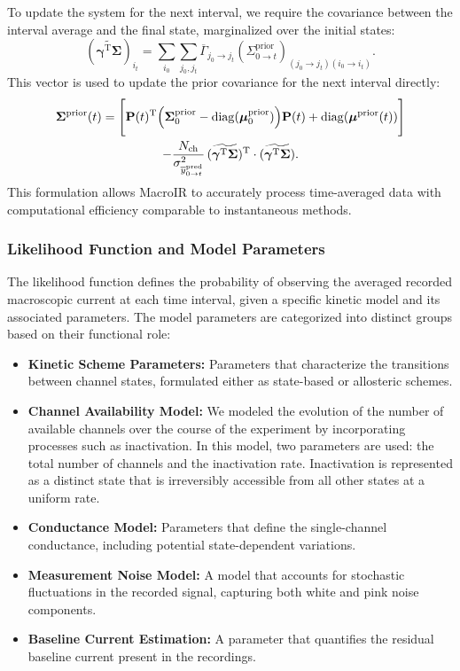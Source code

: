 \documentclass[9pt]{elife}
\begin{document}
To update the system for the next interval, we require the covariance between the interval average and the final state, marginalized over the initial states:
\begin{equation}
	(\widetilde{\boldsymbol{\gamma}^{\mathrm{T}} \boldsymbol{\Sigma}})_{i_t} = \sum_{i_0} \sum_{j_0, j_t} \overline{\Gamma}_{j_0 \rightarrow j_t} (\Sigma^{\text{prior}}_{0 \rightarrow t})_{(j_0 \rightarrow j_t)(i_0 \rightarrow i_t)}.
\end{equation}
This vector is used to update the prior covariance for the next interval directly:
\begin{multline}
	\boldsymbol{\Sigma}^{\text{prior}}(t) = \Biggl[ \mathbf{P}(t)^{\mathrm{T}} \Bigl( \boldsymbol{\Sigma}^{\text{prior}}_{0} - \mathrm{diag}(\boldsymbol{\mu}^{\text{prior}}_{0}) \Bigr) \mathbf{P}(t) + \mathrm{diag}(\boldsymbol{\mu}^{\text{prior}}(t)) \Biggr] \\ 
	- \frac{N_{\text{ch}}}{\sigma^2_{\overline{y}^{\text{pred}}_{0 \rightarrow t}}} \, (\widetilde{\boldsymbol{\gamma}^{\mathrm{T}} \boldsymbol{\Sigma}})^{\mathrm{T}} \cdot (\widetilde{\boldsymbol{\gamma}^{\mathrm{T}} \boldsymbol{\Sigma}}).
	\label{eq:prior_covariance_update}
\end{multline}
This formulation allows MacroIR to accurately process time-averaged data with computational efficiency comparable to instantaneous methods.

	\subsubsection{Likelihood Function and Model Parameters}
	The likelihood function defines the probability of observing the averaged recorded macroscopic current at each time interval, given a specific kinetic model and its associated parameters. The model parameters are categorized into distinct groups based on their functional role:
	
	\begin{itemize}
		\item \textbf{Kinetic Scheme Parameters:} Parameters that characterize the transitions between channel states, formulated either as state-based or allosteric schemes.
		\item \textbf{Channel Availability Model:} We modeled the evolution of the number of available channels over the course of the experiment by incorporating processes such as inactivation. In this model, two parameters are used: the total number of channels and the inactivation rate. Inactivation is represented as a distinct state that is irreversibly accessible from all other states at a uniform rate.
		\item \textbf{Conductance Model:} Parameters that define the single-channel conductance, including potential state-dependent variations. 
		\item \textbf{Measurement Noise Model:} A model that accounts for stochastic fluctuations in the recorded signal, capturing both white and pink noise components.
		\item \textbf{Baseline Current Estimation:} A parameter that quantifies the residual baseline current present in the recordings.
	\end{itemize}
	
\end{document}
